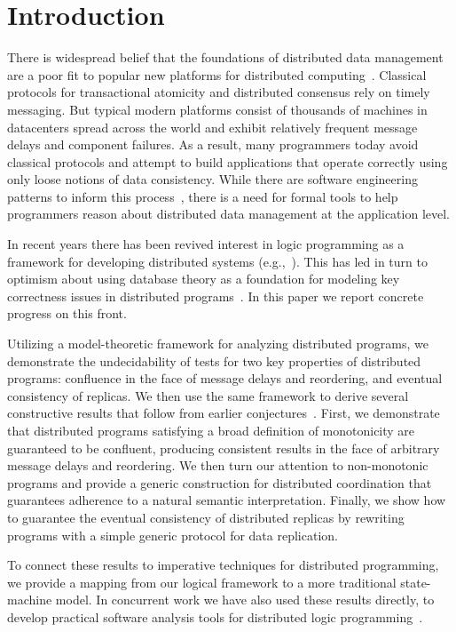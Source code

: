 \section{Introduction}

There is widespread belief that the foundations of distributed data management
are a poor fit to popular new platforms for distributed
computing~\cite{ladis}. Classical protocols for transactional atomicity and
distributed consensus rely on timely messaging. But typical modern platforms
consist of thousands of machines in datacenters spread across the world and
exhibit relatively frequent message delays and component failures.  As a result,
many programmers today avoid classical protocols and attempt to build
applications that operate correctly using only loose notions of data
consistency.  While there are software engineering patterns to inform this
process~\cite{quicksand}, there is a need for formal tools to help programmers
reason about distributed data management at the application level.

In recent years there has been revived interest in logic programming as a
framework for developing distributed systems (e.g.,~\cite{boom,reactors}).  This
has led in turn to optimism about using database theory as a foundation for
modeling key correctness issues in distributed
programs~\cite{declarative-imperative}.  In this paper we report concrete
progress on this front.

Utilizing a model-theoretic framework for analyzing distributed programs, we
demonstrate the undecidability of tests for two key properties of distributed
programs: confluence in the face of message delays and reordering, and eventual consistency of replicas.  We
then use the same framework to derive several constructive results that follow
from earlier conjectures~\cite{declarative-imperative}.  First, we demonstrate
that distributed programs satisfying a broad definition of monotonicity are
guaranteed to be confluent, producing consistent results in the face of
arbitrary message delays and reordering.  We then turn our attention to
non-monotonic programs and provide a generic construction for distributed
coordination that guarantees adherence to a natural semantic interpretation.
Finally, we show how to guarantee the eventual consistency of distributed
replicas by rewriting programs with a simple generic protocol for data
replication.

To connect these results to imperative techniques for distributed programming,
we provide a mapping from our logical framework to a more traditional
state-machine model.  In concurrent work we have also used these results
directly, to develop practical software analysis tools for distributed logic
programming~\cite{cidr11}.

